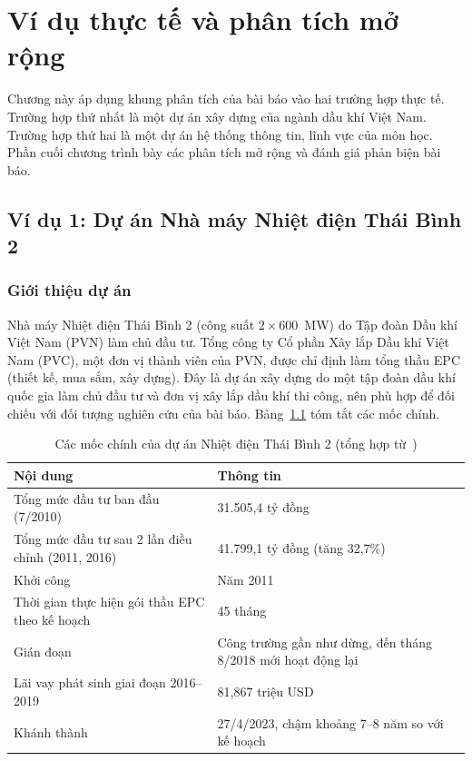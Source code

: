 \chapter{Ví dụ thực tế và phân tích mở rộng}
\label{chuong:mo-rong}

Chương này áp dụng khung phân tích của bài báo vào hai trường hợp thực tế. Trường hợp thứ nhất là một dự án xây dựng của ngành dầu khí Việt Nam. Trường hợp thứ hai là một dự án hệ thống thông tin, lĩnh vực của môn học. Phần cuối chương trình bày các phân tích mở rộng và đánh giá phản biện bài báo.

\section{Ví dụ 1: Dự án Nhà máy Nhiệt điện Thái Bình 2}
\label{sec:thai-binh-2}

\subsection{Giới thiệu dự án}

Nhà máy Nhiệt điện Thái Bình 2 (công suất $2 \times 600$~MW) do Tập đoàn Dầu khí Việt Nam (PVN) làm chủ đầu tư. Tổng công ty Cổ phần Xây lắp Dầu khí Việt Nam (PVC), một đơn vị thành viên của PVN, được chỉ định làm tổng thầu EPC (thiết kế, mua sắm, xây dựng). Đây là dự án xây dựng do một tập đoàn dầu khí quốc gia làm chủ đầu tư và đơn vị xây lắp dầu khí thi công, nên phù hợp để đối chiếu với đối tượng nghiên cứu của bài báo. Bảng~\ref{tab:tb2} tóm tắt các mốc chính.

\begin{table}[H]
\centering
\caption{Các mốc chính của dự án Nhiệt điện Thái Bình 2 (tổng hợp từ~\cite{bdt2020tb2,moit2023tb2,investor2023tb2})}
\label{tab:tb2}
\begin{tabularx}{\textwidth}{@{}lX@{}}
\toprule
\textbf{Nội dung} & \textbf{Thông tin} \\
\midrule
Tổng mức đầu tư ban đầu (7/2010) & 31.505,4 tỷ đồng \\
Tổng mức đầu tư sau 2 lần điều chỉnh (2011, 2016) & 41.799,1 tỷ đồng (tăng 32,7\%) \\
Khởi công & Năm 2011 \\
Thời gian thực hiện gói thầu EPC theo kế hoạch & 45 tháng \\
Gián đoạn & Công trường gần như dừng, đến tháng 8/2018 mới hoạt động lại \\
Lãi vay phát sinh giai đoạn 2016--2019 & 81,867 triệu USD \\
Khánh thành & 27/4/2023, chậm khoảng 7--8 năm so với kế hoạch \\
\bottomrule
\end{tabularx}
\end{table}

